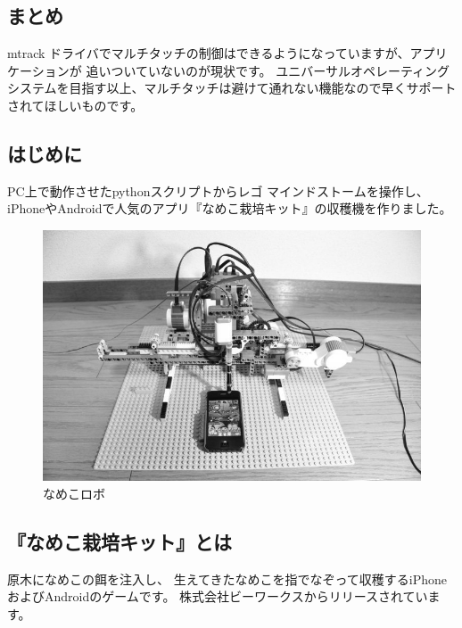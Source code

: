 \documentclass[mingoth,a4paper]{jsarticle}
\begin{document}
\subsection{まとめ}

mtrack ドライバでマルチタッチの制御はできるようになっていますが、アプリケーションが
追いついていないのが現状です。
ユニバーサルオペレーティングシステムを目指す以上、マルチタッチは避けて通れない機能なので早くサポートされてほしいものです。


\subsection{はじめに}

PC上で動作させたpythonスクリプトからレゴ マインドストームを操作し、
iPhoneやAndroidで人気のアプリ『なめこ栽培キット』の収穫機を作りました。

\begin{figure}[ht]
  \begin{center}
    \includegraphics[width=0.7\hsize]{image201210/nxt-python_namekorobo2_mono.jpg}
  \end{center}
  \caption{なめこロボ}
  \label{fig:namekorobo2}
\end{figure}

\subsection{『なめこ栽培キット』とは}

原木になめこの餌を注入し、
生えてきたなめこを指でなぞって収穫するiPhoneおよびAndroidのゲームです。
株式会社ビーワークスからリリースされています。
\end{document}
